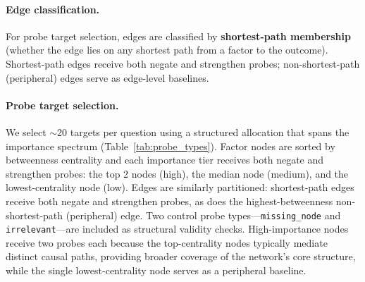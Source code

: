 \documentclass[11pt]{article}
\begin{document}
\paragraph{Edge classification.} For probe target selection, edges are classified by \textbf{shortest-path membership} (whether the edge lies on any shortest path from a factor to the outcome). Shortest-path edges receive both negate and strengthen probes; non-shortest-path (peripheral) edges serve as edge-level baselines.

\paragraph{Probe target selection.} We select ${\sim}$20 targets per question using a structured allocation that spans the importance spectrum (Table~\ref{tab:probe_types}). Factor nodes are sorted by betweenness centrality and each importance tier receives both negate and strengthen probes: the top 2 nodes (high), the median node (medium), and the lowest-centrality node (low). Edges are similarly partitioned: shortest-path edges receive both negate and strengthen probes, as does the highest-betweenness non-shortest-path (peripheral) edge. Two control probe types---\texttt{missing\_node} and \texttt{irrelevant}---are included as structural validity checks. High-importance nodes receive two probes each because the top-centrality nodes typically mediate distinct causal paths, providing broader coverage of the network's core structure, while the single lowest-centrality node serves as a peripheral baseline.
\end{document}
